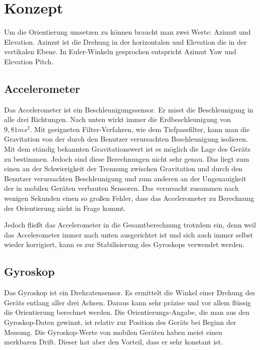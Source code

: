 
\chapter{Konzept}
  \label{Konzept}
  
Um die Orientierung umsetzen zu können braucht man zwei Werte: Azimut und Elevation. Azimut ist die Drehung in der horizontalen und Elevation die in der vertikalen Ebene. In Euler-Winkeln gesprochen entspricht Azimut Yaw und Elevation Pitch.

\section{Accelerometer}
Das Accelerometer ist ein Beschleunigungssensor. Er misst die Beschleunigung in alle drei Richtungen. Nach unten wirkt immer die Erdbeschleunigung von $9,81ms^2$. Mit geeigneten Filter-Verfahren, wie dem Tiefpassfilter, kann man die Gravitation von der durch den Benutzer verursachten Beschleunigung isolieren. Mit dem ständig bekannten Gravitationswert ist es möglich die Lage des Geräts zu bestimmen. Jedoch sind diese Berechnungen nicht sehr genau. Das liegt zum einen an der Schwierigkeit der Trennung zwischen Gravitation und durch den Benutzer verursachten Beschleunigung und zum anderen an der Ungenauigkeit der in mobilen Geräten verbauten Sensoren. Das verursacht zusammen nach wenigen Sekunden einen so großen Fehler, dass das Accelerometer zu Berechnung der Orientierung nicht in Frage kommt.

Jedoch fließt das Accelerometer in die Gesamtberechnung trotzdem ein, denn weil das Accelerometer immer nach unten ausgerichtet ist und sich auch immer selbst wieder korrigiert, kann es zur Stabilisierung des Gyroskops verwendet werden.

\section{Gyroskop}

Das Gyroskop ist ein Drehratensensor. Es ermittelt die Winkel einer Drehung des Geräts entlang aller drei Achsen. Daraus kann sehr präzise und vor allem flüssig die Orientierung berechnet werden. Die Orientierungs-Angabe, die man aus den Gyroskop-Daten gewinnt, ist relativ zur Position des Geräts bei Beginn der Messung. Die Gyroskop-Werte von mobilen Geräten haben meist einen merkbaren Drift. Dieser hat aber den Vorteil, dass er sehr konstant ist.
  
